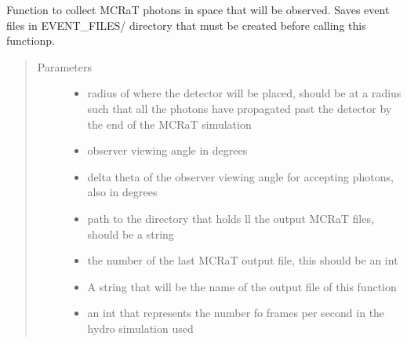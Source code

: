 \documentclass[letterpaper,10pt,english]{sphinxmanual}
\begin{document}

\begin{fulllineitems}
\label{\detokenize{mclib:mclib.event_h5}}
Function to collect MCRaT photons in space that will be observed. Saves event files in EVENT\_FILES/ directory that
must be created before calling this functionp.
\begin{quote}\begin{description}
\item[{Parameters}] \leavevmode\begin{itemize}
\item {} 
 \textendash{} radius of where the detector will be placed, should be at a radius such that all the photons have
propagated past the detector by the end of the MCRaT simulation

\item {} 
 \textendash{} observer viewing angle in degrees

\item {} 
 \textendash{} delta theta of the observer viewing angle for accepting photons, also in degrees

\item {} 
 \textendash{} path to the directory that holds ll the output MCRaT files, should be a string

\item {} 
 \textendash{} the number of the last MCRaT output file, this should be an int

\item {} 
 \textendash{} A string that will be the name of the output file of this function

\item {} 
 \textendash{} an int that represents the number fo frames per second in the hydro simulation used


\end{itemize}
\end{description}
\end{quote}
\end{fulllineitems}
\end{document}
